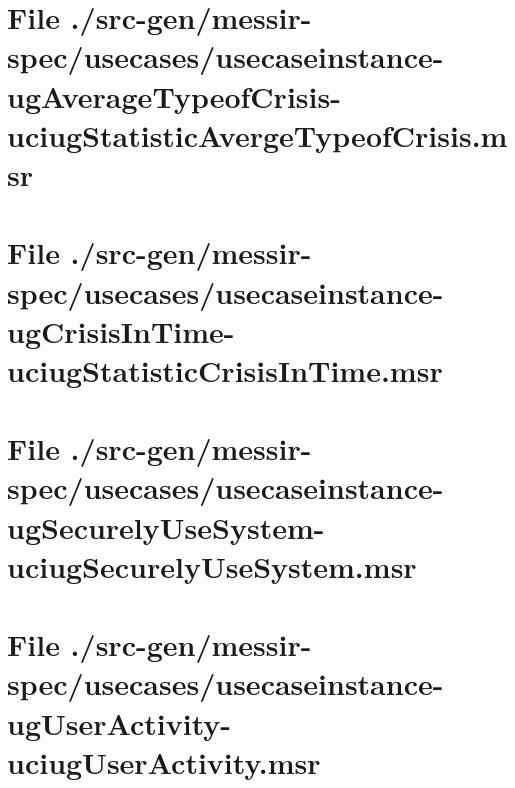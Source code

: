 \section[File /.../usecaseinstance-ugAverageTypeofCrisis-uciugStatisticAvergeTypeofCrisis.msr]{File ./src-gen/messir-spec/usecases/usecaseinstance-ugAverageTypeofCrisis-uciugStatisticAvergeTypeofCrisis.msr}
\scriptsize

\normalsize
	
\section[File /src-gen.../usecaseinstance-ugCrisisInTime-uciugStatisticCrisisInTime.msr]{File ./src-gen/messir-spec/usecases/usecaseinstance-ugCrisisInTime-uciugStatisticCrisisInTime.msr}
\scriptsize

\normalsize
	
\section[File /src-gen.../usecaseinstance-ugSecurelyUseSystem-uciugSecurelyUseSystem.msr]{File ./src-gen/messir-spec/usecases/usecaseinstance-ugSecurelyUseSystem-uciugSecurelyUseSystem.msr}
\scriptsize

\normalsize
	
\section[File /src-gen.../usecaseinstance-ugUserActivity-uciugUserActivity.msr]{File ./src-gen/messir-spec/usecases/usecaseinstance-ugUserActivity-uciugUserActivity.msr}
\scriptsize

\normalsize
	
